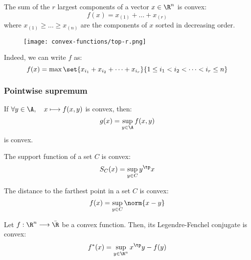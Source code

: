 \begin{example}
    The sum of the $r$ largest components of a vector $x\in\R^n$ is convex:
    \begin{equation*}
        f(x) = x_{(1)} + \dots + x_{(r)}
    \end{equation*}
    where $x_{(1)}\geq\dots\geq x_{(n)}$ are the components of $x$ sorted in decreasing order.
    \begin{figure}[H]
        \centering
        \texttt{[image: convex-functions/top-r.png]}
    \end{figure}
    Indeed, we can write $f$ as:
    \begin{equation*}
        f(x) = \max\set{x_{i_1} + x_{i_2} + \dots + x_{i_r}}{1\leq i_1<i_2<\dots<i_r\leq n}
    \end{equation*}
\end{example}

\subsubsection{Pointwise supremum}
\begin{property}
    If $\forall y\in\A, \quad x\longmapsto f(x, y)$ is convex, then:
    \begin{equation*}
        g(x) = \sup_{y\in\A} f(x, y)
    \end{equation*}
    is convex.
\end{property}

\begin{example}
    The support function of a set $C$ is convex:
    \begin{equation*}
        S_C(x) = \sup_{y\in C} y^\tp x
    \end{equation*}
\end{example}

\begin{example}
    The distance to the farthest point in a set $C$ is convex:
    \begin{equation*}
        f(x) = \sup_{y\in C} \norm{x-y}
    \end{equation*}
\end{example}

\begin{example}
    Let $f:\R^n\longrightarrow\bar{\R}$ be a convex function. Then, its Legendre-Fenchel conjugate is convex:
    \begin{equation*}
        f^*(x) = \sup_{y\in\R^n} x^\tp y - f(y)
    \end{equation*}
\end{example}

